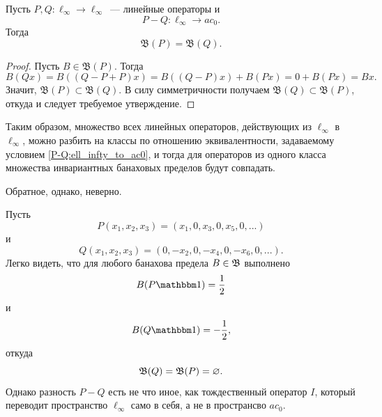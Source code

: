 \begin{proposition}
	\label{thm:linear_op_equiv_ac0}
	Пусть $P,Q:\ell_\infty \to \ell_\infty$~--- линейные операторы и
	\begin{equation}\label{P-Q:ell_infty_to_ac0}
		P-Q : \ell_\infty \to ac_0
		.
	\end{equation}
	Тогда
	\begin{equation}
		\mathfrak{B}(P)=\mathfrak{B}(Q)
		.
	\end{equation}
\end{proposition}

\begin{proof}
	Пусть $B\in \mathfrak{B}(P)$.
	Тогда
	\begin{equation}
		B(Qx) = B((Q-P+P)x) =
		B((Q-P)x)+B(Px) =
		0 + B(Px) =
		Bx
		.
	\end{equation}
	Значит, $\mathfrak{B}(P) \subset \mathfrak{B}(Q)$.
	В силу симметричности получаем $\mathfrak{B}(Q) \subset \mathfrak{B}(P)$,
	откуда и следует требуемое утверждение.
\end{proof}

Таким образом, множество всех линейных операторов,
действующих из $\ell_\infty$ в $\ell_\infty$, можно разбить на классы по отношению эквивалентности,
задаваемому условием \eqref{P-Q:ell_infty_to_ac0},
и тогда для операторов из одного класса множества инвариантных банаховых пределов будут совпадать.

Обратное, однако, неверно.

\begin{example}
	Пусть
	\begin{equation}
		P(x_1,x_2,x_3) = (x_1, 0, x_3, 0, x_5, 0, ...)
	\end{equation}
	и
	\begin{equation}
		Q(x_1,x_2,x_3) = (0, -x_2, 0, -x_4, 0, -x_6, 0, ...)
		.
	\end{equation}
	Легко видеть, что для любого банахова предела $B\in\mathfrak{B}$ выполнено
	\begin{equation}
		B(P\one) = \frac{1}{2}
	\end{equation}
	и
	\begin{equation}
		B(Q\one) = -\frac{1}{2}
		,
	\end{equation}
	откуда
	\begin{equation}
		\mathfrak{B}(Q) = \mathfrak{B}(P) = \varnothing
		.
	\end{equation}
	Однако разность $P-Q$ есть не что иное, как тождественный оператор $I$,
	который переводит пространство $\ell_\infty$ само в себя,
	а не в пространсво $ac_0$.
\end{example}
